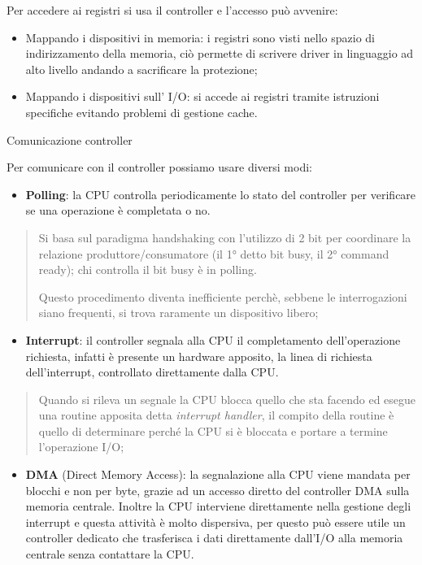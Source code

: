 Per accedere ai registri si usa il controller e l'accesso può avvenire:

\begin{itemize}
\item
  Mappando i dispositivi in memoria: i registri sono visti nello spazio
  di indirizzamento della memoria, ciò permette di scrivere driver in
  linguaggio ad alto livello andando a sacrificare la protezione;
\item
  Mappando i dispositivi sull' I/O: si accede ai registri tramite
  istruzioni specifiche evitando problemi di gestione cache.
\end{itemize}

Comunicazione controller

Per comunicare con il controller possiamo usare diversi modi:

\begin{itemize}
\item
  \textbf{Polling}: la CPU controlla periodicamente lo stato del
  controller per verificare se una operazione è completata o no.
\end{itemize}

\begin{quote}
Si basa sul paradigma handshaking con l'utilizzo di 2 bit per coordinare
la relazione produttore/consumatore (il 1° detto bit busy, il 2° command
ready); chi controlla il bit busy è in polling.

Questo procedimento diventa inefficiente perchè, sebbene le
interrogazioni siano frequenti, si trova raramente un dispositivo
libero;
\end{quote}

\begin{itemize}
\item
  \textbf{Interrupt}: il controller segnala alla CPU il completamento
  dell'operazione richiesta, infatti è presente un hardware apposito, la
  linea di richiesta dell'interrupt, controllato direttamente dalla CPU.
\end{itemize}

\begin{quote}
Quando si rileva un segnale la CPU blocca quello che sta facendo ed
esegue una routine apposita detta \emph{interrupt handler}, il compito
della routine è quello di determinare perché la CPU si è bloccata e
portare a termine l'operazione I/O;
\end{quote}

\begin{itemize}
\item
  \textbf{DMA} (Direct Memory Access): la segnalazione alla CPU viene
  mandata per blocchi e non per byte, grazie ad un accesso diretto del
  controller DMA sulla memoria centrale. Inoltre la CPU interviene
  direttamente nella gestione degli interrupt e questa attività è molto
  dispersiva, per questo può essere utile un controller dedicato che
  trasferisca i dati direttamente dall'I/O alla memoria centrale senza
  contattare la CPU.
\end{itemize}

